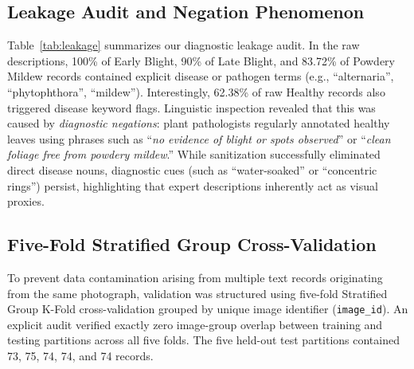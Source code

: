 \documentclass[conference]{IEEEtran}
\begin{document}
\begin{table}[t]
\caption{Diagnostic Text Leakage Audit (Pre- vs. Post-Sanitization)}
\label{tab:leakage}
\centering
{}
\end{table}

\subsection{Leakage Audit and Negation Phenomenon}
Table~\ref{tab:leakage} summarizes our diagnostic leakage audit. In the raw descriptions, 100\% of Early Blight, 90\% of Late Blight, and 83.72\% of Powdery Mildew records contained explicit disease or pathogen terms (e.g., ``alternaria'', ``phytophthora'', ``mildew''). Interestingly, 62.38\% of raw Healthy records also triggered disease keyword flags. Linguistic inspection revealed that this was caused by \textit{diagnostic negations}: plant pathologists regularly annotated healthy leaves using phrases such as ``\textit{no evidence of blight or spots observed}'' or ``\textit{clean foliage free from powdery mildew}.'' While sanitization successfully eliminated direct disease nouns, diagnostic cues (such as ``water-soaked'' or ``concentric rings'') persist, highlighting that expert descriptions inherently act as visual proxies.

\subsection{Five-Fold Stratified Group Cross-Validation}
To prevent data contamination arising from multiple text records originating from the same photograph, validation was structured using five-fold Stratified Group K-Fold cross-validation grouped by unique image identifier (\texttt{image\_id}). An explicit audit verified exactly zero image-group overlap between training and testing partitions across all five folds. The five held-out test partitions contained 73, 75, 74, 74, and 74 records.
\end{document}

